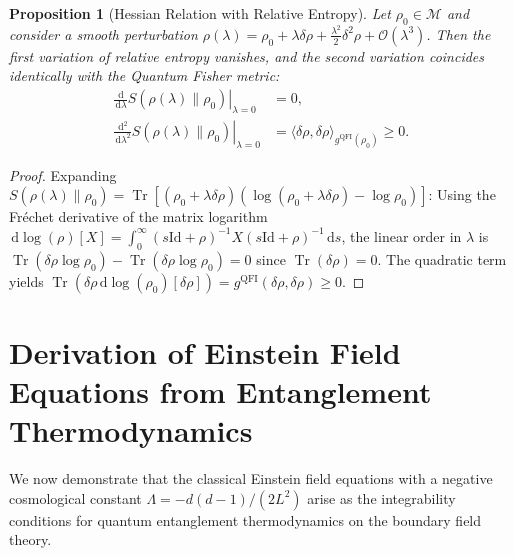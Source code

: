 \documentclass[11pt,a4paper,reqno]{amsart}
\newtheorem{proposition}[theorem]{Proposition}
\theoremstyle{definition}
\numberwithin{equation}{section}
\newcommand{\Id}{\mathrm{Id}}
\newcommand{\Tr}{\operatorname{Tr}}
\newcommand{\dif}{\,\mathrm{d}}
\begin{document}
\begin{proposition}[Hessian Relation with Relative Entropy]
\label{prop:relative_entropy_hessian}
Let $\rho_0 \in \mathcal{M}$ and consider a smooth perturbation $\rho(\lambda) = \rho_0 + \lambda \delta \rho + \frac{\lambda^2}{2} \delta^2 \rho + \mathcal{O}(\lambda^3)$. Then the first variation of relative entropy vanishes, and the second variation coincides identically with the Quantum Fisher metric:
\begin{align}
    \left. \frac{\dif}{\dif \lambda} S(\rho(\lambda) \| \rho_0) \right|_{\lambda=0} &= 0, \\
    \left. \frac{\dif^2}{\dif \lambda^2} S(\rho(\lambda) \| \rho_0) \right|_{\lambda=0} &= \langle \delta \rho, \delta \rho \rangle_{g^{\mathrm{QFI}}(\rho_0)} \ge 0.
\end{align}
\end{proposition}
\begin{proof}
Expanding $S(\rho(\lambda) \| \rho_0) = \Tr[(\rho_0 + \lambda \delta \rho)(\log(\rho_0 + \lambda \delta \rho) - \log \rho_0)]$:
Using the Fr\'echet derivative of the matrix logarithm $\dif \log(\rho)[X] = \int_0^\infty (s\Id + \rho)^{-1} X (s\Id + \rho)^{-1} \dif s$, the linear order in $\lambda$ is $\Tr(\delta \rho \log \rho_0) - \Tr(\delta \rho \log \rho_0) = 0$ since $\Tr(\delta \rho) = 0$. The quadratic term yields $\Tr(\delta \rho \dif \log(\rho_0)[\delta \rho]) = g^{\mathrm{QFI}}(\delta \rho, \delta \rho) \ge 0$.
\end{proof}

\section{Derivation of Einstein Field Equations from Entanglement Thermodynamics}
\label{sec:einstein_derivation}

We now demonstrate that the classical Einstein field equations with a negative cosmological constant $\Lambda = -d(d-1)/(2 L^2)$ arise as the integrability conditions for quantum entanglement thermodynamics on the boundary field theory.
\end{document}
